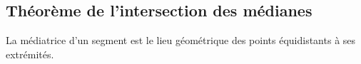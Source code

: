 \documentclass[a4paper,12pt]{article}
\begin{document}
\subsection{Théorème de l'intersection des médianes}
\begin{theorem}
La médiatrice d'un segment est le lieu géométrique des points équidistants à ses extrémités.
\end{theorem}
\end{document}
